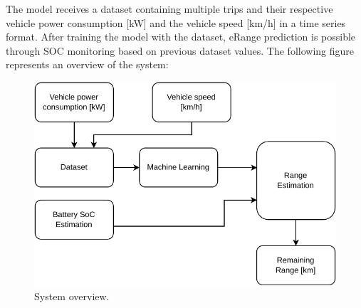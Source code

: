 The model receives a \gls{dataset} containing multiple
trips and their respective vehicle power consumption [kW]
and the vehicle speed [km/h] in a  time series format.
After training the model with the dataset,
\gls{eRange} prediction is possible through
\gls{SOC} monitoring based on previous \gls{dataset} values.
The following figure represents an overview of the system:

\begin{figure}[H]
    \begin{center}
        \includegraphics[scale=1.0]{../figures/generic_diagram}
        \caption{System overview.}
    \end{center}
\end{figure}

